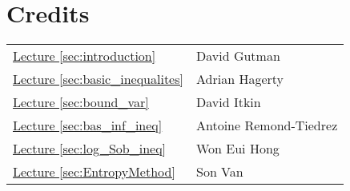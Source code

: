 \documentclass{amsproc}
\newcommand{\fref}[2]{\hyperref[#2]{#1 \ref*{#2}}}
\begin{document}
\section*{Credits}
	\begin{tabular}{ll}
		\fref{Lecture}{sec:introduction}& David Gutman\\
		\fref{Lecture}{sec:basic_inequalites}& Adrian Hagerty\\
		\fref{Lecture}{sec:bound_var}& David Itkin\\
		\fref{Lecture}{sec:bas_inf_ineq}& Antoine Remond-Tiedrez\\
		\fref{Lecture}{sec:log_Sob_ineq}& Won Eui Hong \\
        \fref{Lecture}{sec:EntropyMethod}& Son Van \\
	\end{tabular}



\end{document}
